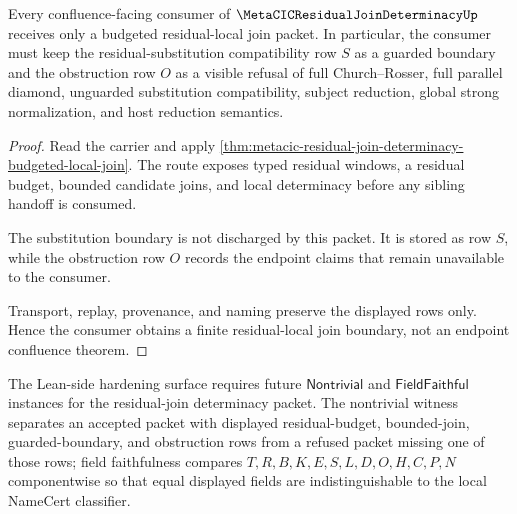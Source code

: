 \begin{theorem}
\label{thm:metacic-residual-join-determinacy-boundary}
Every confluence-facing consumer of $\MetaCICResidualJoinDeterminacyUp$ receives only a budgeted residual-local join packet. In particular, the consumer must keep the residual-substitution compatibility row $S$ as a guarded boundary and the obstruction row $O$ as a visible refusal of full Church--Rosser, full parallel diamond, unguarded substitution compatibility, subject reduction, global strong normalization, and host reduction semantics.
\end{theorem}
\begin{proof}
Read the carrier and apply \autoref{thm:metacic-residual-join-determinacy-budgeted-local-join}. The route exposes typed residual windows, a residual budget, bounded candidate joins, and local determinacy before any sibling handoff is consumed.

The substitution boundary is not discharged by this packet. It is stored as row $S$, while the obstruction row $O$ records the endpoint claims that remain unavailable to the consumer.

Transport, replay, provenance, and naming preserve the displayed rows only. Hence the consumer obtains a finite residual-local join boundary, not an endpoint confluence theorem.
\end{proof}



The Lean-side hardening surface requires future $\mathsf{Nontrivial}$ and $\mathsf{FieldFaithful}$ instances for the residual-join determinacy packet. The nontrivial witness separates an accepted packet with displayed residual-budget, bounded-join, guarded-boundary, and obstruction rows from a refused packet missing one of those rows; field faithfulness compares $T,R,B,K,E,S,L,D,O,H,C,P,N$ componentwise so that equal displayed fields are indistinguishable to the local NameCert classifier.

